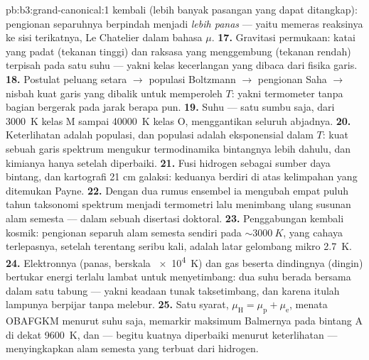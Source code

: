 \begin{solution}{pb:b3:grand-canonical:1}
kembali (lebih banyak pasangan yang dapat ditangkap): pengionan separuhnya
berpindah menjadi \emph{lebih panas} --- yaitu memeras reaksinya ke sisi
terikatnya, Le Chatelier dalam bahasa $\mu$.
\textbf{17.} Gravitasi permukaan: katai yang padat (tekanan tinggi) dan
raksasa yang menggembung (tekanan rendah) terpisah pada satu suhu ---
yakni kelas kecerlangan yang dibaca dari fisika garis.
\textbf{18.} Postulat peluang setara $\to$ populasi Boltzmann
$\to$ pengionan Saha $\to$ nisbah kuat garis yang dibalik untuk
memperoleh $T$: yakni termometer tanpa bagian bergerak pada jarak berapa pun.
\textbf{19.} Suhu --- satu sumbu saja, dari \qty{3000}{K} kelas M sampai
\qty{40000}{K} kelas O, menggantikan seluruh abjadnya.
\textbf{20.} Keterlihatan adalah populasi, dan populasi adalah
eksponensial dalam $T$: kuat sebuah garis spektrum mengukur
termodinamika bintangnya lebih dahulu, dan kimianya hanya setelah
diperbaiki.
\textbf{21.} Fusi hidrogen sebagai sumber daya bintang, dan
kartografi 21 cm galaksi: keduanya berdiri di atas kelimpahan yang
ditemukan Payne.
\textbf{22.} Dengan dua rumus ensembel ia mengubah empat puluh tahun
taksonomi spektrum menjadi termometri lalu menimbang ulang susunan
alam semesta --- dalam sebuah disertasi doktoral.
\textbf{23.} Penggabungan kembali kosmik: pengionan separuh alam
semesta sendiri pada $\sim\qty{3000}{K}$, yang cahaya terlepasnya,
setelah terentang seribu kali, adalah latar gelombang mikro \qty{2.7}{K}.
\textbf{24.} Elektronnya (panas, berskala \qty{e4}{K}) dan gas
beserta dindingnya (dingin) bertukar energi terlalu lambat untuk
menyetimbang: dua suhu berada bersama dalam satu tabung --- yakni keadaan
tunak taksetimbang, dan karena itulah lampunya berpijar tanpa melebur.
\textbf{25.} Satu syarat, $\mu_{\text{H}} = \mu_{\text{p}} +
\mu_{\text{e}}$, menata OBAFGKM menurut suhu saja, memarkir
maksimum Balmernya pada bintang A di dekat \qty{9600}{K}, dan --- begitu
kuatnya diperbaiki menurut keterlihatan --- menyingkapkan alam semesta
yang terbuat dari hidrogen.
\end{solution}
